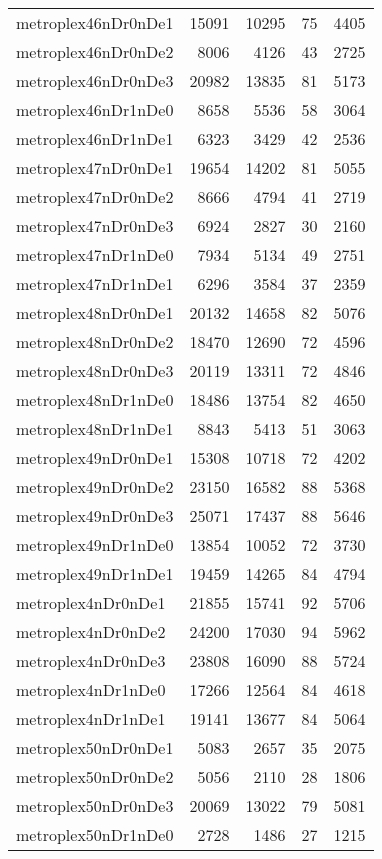 \begin{longtable}{lrrrr}
metroplex46nDr0nDe1 & 15091 & 10295 & 75 & 4405 \\
metroplex46nDr0nDe2 & 8006 & 4126 & 43 & 2725 \\
metroplex46nDr0nDe3 & 20982 & 13835 & 81 & 5173 \\
metroplex46nDr1nDe0 & 8658 & 5536 & 58 & 3064 \\
metroplex46nDr1nDe1 & 6323 & 3429 & 42 & 2536 \\
metroplex47nDr0nDe1 & 19654 & 14202 & 81 & 5055 \\
metroplex47nDr0nDe2 & 8666 & 4794 & 41 & 2719 \\
metroplex47nDr0nDe3 & 6924 & 2827 & 30 & 2160 \\
metroplex47nDr1nDe0 & 7934 & 5134 & 49 & 2751 \\
metroplex47nDr1nDe1 & 6296 & 3584 & 37 & 2359 \\
metroplex48nDr0nDe1 & 20132 & 14658 & 82 & 5076 \\
metroplex48nDr0nDe2 & 18470 & 12690 & 72 & 4596 \\
metroplex48nDr0nDe3 & 20119 & 13311 & 72 & 4846 \\
metroplex48nDr1nDe0 & 18486 & 13754 & 82 & 4650 \\
metroplex48nDr1nDe1 & 8843 & 5413 & 51 & 3063 \\
metroplex49nDr0nDe1 & 15308 & 10718 & 72 & 4202 \\
metroplex49nDr0nDe2 & 23150 & 16582 & 88 & 5368 \\
metroplex49nDr0nDe3 & 25071 & 17437 & 88 & 5646 \\
metroplex49nDr1nDe0 & 13854 & 10052 & 72 & 3730 \\
metroplex49nDr1nDe1 & 19459 & 14265 & 84 & 4794 \\
metroplex4nDr0nDe1 & 21855 & 15741 & 92 & 5706 \\
metroplex4nDr0nDe2 & 24200 & 17030 & 94 & 5962 \\
metroplex4nDr0nDe3 & 23808 & 16090 & 88 & 5724 \\
metroplex4nDr1nDe0 & 17266 & 12564 & 84 & 4618 \\
metroplex4nDr1nDe1 & 19141 & 13677 & 84 & 5064 \\
metroplex50nDr0nDe1 & 5083 & 2657 & 35 & 2075 \\
metroplex50nDr0nDe2 & 5056 & 2110 & 28 & 1806 \\
metroplex50nDr0nDe3 & 20069 & 13022 & 79 & 5081 \\
metroplex50nDr1nDe0 & 2728 & 1486 & 27 & 1215 \\

\end{longtable}
